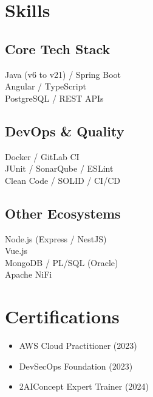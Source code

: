 \documentclass[a4paper,10pt]{article}
\begin{document}
\noindent
\begin{minipage}[t]{0.3\textwidth}
  \section*{Skills}
  \begin{tcolorbox}[cvbox, width=\linewidth]
      \subsection*{Core Tech Stack}
      {\normalsize
      Java (v6 to v21) / Spring Boot \\
      Angular / TypeScript \\
      PostgreSQL / REST APIs
      } \\[0.5em]
      
      \subsection*{DevOps \& Quality}
      {\normalsize
      Docker / GitLab CI \\
      JUnit / SonarQube / ESLint \\
      Clean Code / SOLID / CI/CD
      } \\[0.5em]

      \subsection*{Other Ecosystems}
      {\normalsize
      Node.js (Express / NestJS) \\
      Vue.js \\
      MongoDB / PL/SQL (Oracle) \\
      Apache NiFi
      }
  \end{tcolorbox}

  \section*{Certifications}
  \begin{tcolorbox}[cvbox, width=\linewidth]
    \begin{itemize}[leftmargin=*]
      \item AWS Cloud Practitioner (2023)
      \item DevSecOps Foundation (2023)
      \item 2AIConcept Expert Trainer (2024)
    \end{itemize}
  \end{tcolorbox}


\end{minipage}
\end{document}
